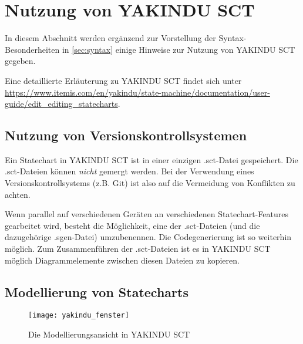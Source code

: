 
\section{Nutzung von YAKINDU SCT}
\label{sec:yakindu}

In diesem Abschnitt werden ergänzend zur Vorstellung der Syntax-Besonderheiten in \autoref{sec:syntax} einige Hinweise zur Nutzung von YAKINDU SCT gegeben.

Eine detaillierte Erläuterung zu YAKINDU SCT findet sich unter \url{https://www.itemis.com/en/yakindu/state-machine/documentation/user-guide/edit_editing_statecharts}.

\enlargethispage{1\baselineskip}








\subsection{Nutzung von Versionskontrollsystemen}

Ein Statechart in YAKINDU SCT ist in einer einzigen .sct-Datei gespeichert. 
Die .sct-Dateien können \emph{nicht} gemergt werden. 
Bei der Verwendung eines Versionskontrollsystems (z.B. Git) ist also auf die Vermeidung von Konflikten zu achten.

Wenn parallel auf verschiedenen Geräten an verschiedenen Statechart-Features gearbeitet wird, besteht die Möglichkeit, eine der .sct-Dateien (und die dazugehörige .sgen-Datei) umzubenennen. 
Die Codegenerierung ist so weiterhin möglich. 
Zum Zusammenführen der .sct-Dateien ist es in YAKINDU SCT möglich Diagrammelemente zwischen diesen Dateien zu kopieren.








\subsection{Modellierung von Statecharts}

\begin{figure}[t]
	\centering
	\texttt{[image: yakindu\_fenster]}
	\caption{Die Modellierungsansicht in YAKINDU SCT}
	\label{fig:yakindu_ui}
\end{figure}

